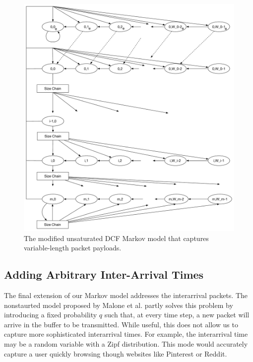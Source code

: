 \documentclass{llncs}
\begin{document}
\begin{figure}
\begin{center}
\includegraphics[scale=0.35]{../../sketches/dcf_model_unsaturated_varpktsize.pdf}
\caption{The modified unsaturated DCF Markov model that captures variable-length packet payloads.}
\label{fig:dcf_model_unsaturated_varpktsize}
\end{center}
\end{figure}

\subsection{Adding Arbitrary Inter-Arrival Times}
The final extension of our Markov model addresses the interarrival packets. The nonstaurted model proposed by Malone et al. \cite{dcf-nonsaturated} partly solves this problem by introducing a fixed probability $q$ such that, at every time step, a new packet will arrive in the buffer to be transmitted. While useful, this does not allow us to capture more sophisticated interarrival times. For example, the interarrival time may be a random variable with a Zipf distribution. This mode would accurately capture a user quickly browsing though websites like Pinterest or Reddit. 
\end{document}
